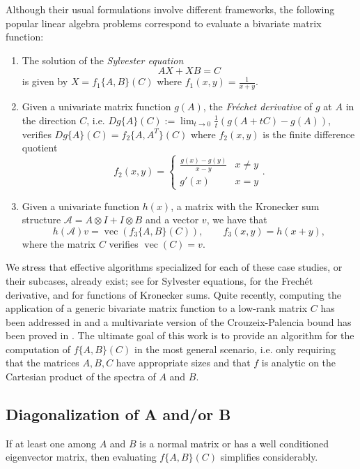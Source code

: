 \documentclass{siamart1116}
\DeclareMathOperator{\vect}{vec}
\begin{document}
Although their usual formulations involve different frameworks, the following popular linear algebra problems 
correspond to evaluate a bivariate matrix function:
\begin{enumerate}
	\item The solution of the \emph{Sylvester equation}
	$$
	AX+XB = C
	$$
is given by $X=f_1\{A,B\}(C)$ where $f_1(x,y)=\frac{1}{x+y}$.
		\item Given a univariate matrix function $g(A)$, the \emph{Fr\'echet derivative} of $g$ at $A$ in the direction $C$, i.e. $Dg\{A\}(C):=\lim_{t\to 0}\frac 1t(g(A+tC)-g(A))$, verifies $Dg\{A\}(C)=f_2\{A,A^T\}(C)$ where $f_2(x,y)$ is the finite difference quotient
		$$
		f_2(x,y)=\begin{cases}
		\frac{g(x)-g(y)}{x-y}&x\neq y\\
		g'(x) & x=y
		\end{cases}.
		$$
	\item Given a univariate function $h(x)$, a matrix with the Kronecker sum structure $\mathcal A= A\otimes I+I\otimes B$ and a vector $v$, we have that $$h(\mathcal A)v=\vect\left( f_3\{A,B\}(C) \right),\qquad f_3(x,y)=h(x+y),$$
	where the matrix $C$ verifies $\vect(C)=v$.
\end{enumerate}
We stress that effective algorithms specialized for each of these case studies, or their subcases, already exist; see \cite{simoncini2016computational} for Sylvester equations, \cite{al2009computing,al2013computing} for the Frech\'et derivative, and \cite{benzi2017approximation,massei2020rational} for functions of Kronecker sums. Quite recently,
 computing the application of a generic bivariate matrix function to a low-rank matrix $C$ has been addressed in \cite{kressner2019krylov} and a multivariate version of the Crouzeix-Palencia bound \cite{crouzeix2017numerical} has been proved in \cite{crouzeix2020bivariate}.
The ultimate goal of this work is to provide an algorithm for the computation of $f\{A,B\}(C)$ in the most general scenario, i.e. only requiring that the matrices $A,B,C$ have appropriate sizes and that $f$ is analytic on the Cartesian product of the spectra of $A$ and $B$.
 
  \subsection{Diagonalization of A and/or B}
 
  If at least one  among $A$ and $B$ is a normal matrix or has a well conditioned eigenvector matrix, then evaluating $f\{A,B\}(C)$ simplifies considerably. 
  
\end{document}
